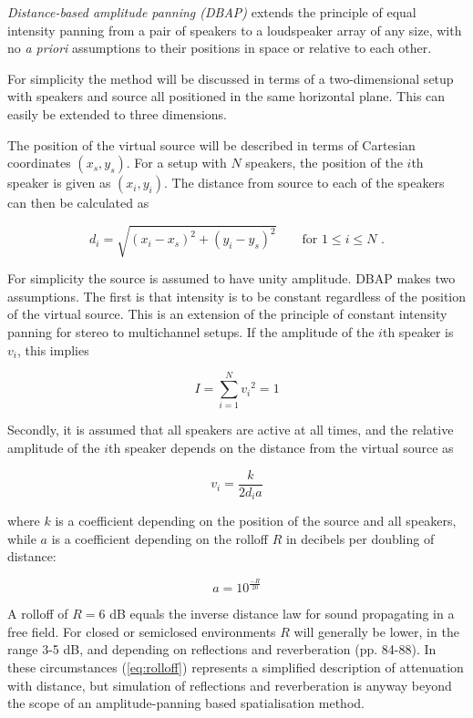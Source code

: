 \documentclass[twoside,10pt]{article}
\begin{document}
\textit{Distance-based amplitude panning (DBAP)} extends the principle of equal intensity panning from a pair of speakers to a loudspeaker array of any size, with no \textit{a priori} assumptions to their positions in space or relative to each other.

For simplicity the method will be discussed in terms of a two-dimensional setup with speakers and source all positioned in the same horizontal plane. This can easily be extended to three dimensions.

The position of the virtual source will be described in terms of Cartesian coordinates $(x_{s}, y_{s})$. For a setup with $N$ speakers, the position of the $i$th speaker is given as $(x_{i}, y_{i})$. The distance from source to each of the speakers can then be calculated as

\begin{equation} \label{eq:distance}
d_{i} = \sqrt{ {(x_{i} - x_{s})}^2 + {(y_{i} - y_{s})}^2 } \qquad \textrm{for } 1 \leq i \leq N \textrm{ .}
\end{equation}

For simplicity the source is assumed to have unity amplitude. DBAP makes two assumptions. The first is that intensity is to be constant regardless of the position of the virtual source. This is an extension of the principle of constant intensity panning for stereo to multichannel setups. If the amplitude of the $i$th speaker is $v_{i}$, this implies

\begin{equation} \label{eq:constant_intensity}
I = \sum_{i=1}^{N} {v_{i}}^2 = 1
\end{equation}

Secondly, it is assumed that all speakers are active at all times, and the relative amplitude of the $i$th speaker depends on the distance from the virtual source as 

\begin{equation} \label{eq:inverse_distance}
v_{i} = \frac{k}{2 d_{i} a} 
\end{equation}

where $k$ is a coefficient depending on the position of the source and all speakers, while $a$ is a coefficient depending on the rolloff $R$ in decibels per doubling of distance:

\begin{equation} \label{eq:rolloff}
	a = 10^{\frac{-R}{20}}
\end{equation}

A rolloff of $R = 6$ dB equals the inverse distance law for sound propagating in a free field. For closed or semiclosed environments $R$ will generally be lower, in the range 3-5 dB, and depending on reflections and reverberation \cite{Everest:2000handbook_acoustics} (pp. 84-88). In these circumstances (\ref{eq:rolloff}) represents a simplified description of attenuation with distance, but simulation of reflections and reverberation is anyway beyond the scope of an amplitude-panning based spatialisation method.
\end{document}
